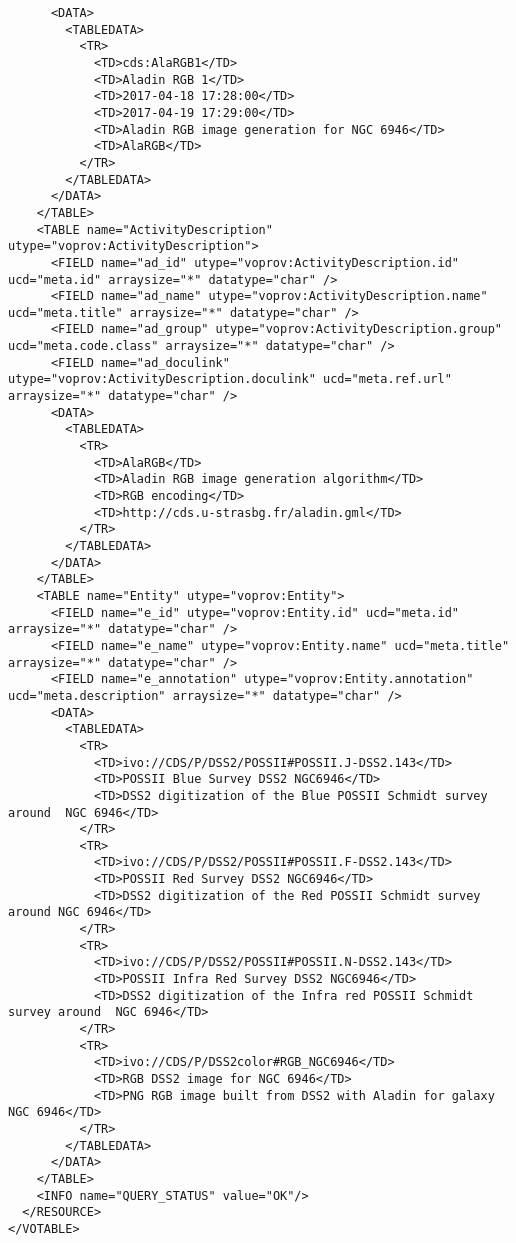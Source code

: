 \begin{verbatim}
      <DATA>
        <TABLEDATA>
          <TR>
            <TD>cds:AlaRGB1</TD>
            <TD>Aladin RGB 1</TD>
            <TD>2017-04-18 17:28:00</TD>
            <TD>2017-04-19 17:29:00</TD>
            <TD>Aladin RGB image generation for NGC 6946</TD>
            <TD>AlaRGB</TD>
          </TR>
        </TABLEDATA>
      </DATA>
    </TABLE>
    <TABLE name="ActivityDescription" utype="voprov:ActivityDescription">
      <FIELD name="ad_id" utype="voprov:ActivityDescription.id" ucd="meta.id" arraysize="*" datatype="char" />
      <FIELD name="ad_name" utype="voprov:ActivityDescription.name" ucd="meta.title" arraysize="*" datatype="char" />
      <FIELD name="ad_group" utype="voprov:ActivityDescription.group" ucd="meta.code.class" arraysize="*" datatype="char" />
      <FIELD name="ad_doculink" utype="voprov:ActivityDescription.doculink" ucd="meta.ref.url" arraysize="*" datatype="char" />
      <DATA>
        <TABLEDATA>
          <TR>
            <TD>AlaRGB</TD>
            <TD>Aladin RGB image generation algorithm</TD>
            <TD>RGB encoding</TD>
            <TD>http://cds.u-strasbg.fr/aladin.gml</TD>
          </TR>
        </TABLEDATA>
      </DATA>
    </TABLE>
    <TABLE name="Entity" utype="voprov:Entity">
      <FIELD name="e_id" utype="voprov:Entity.id" ucd="meta.id"  arraysize="*" datatype="char" />
      <FIELD name="e_name" utype="voprov:Entity.name" ucd="meta.title" arraysize="*" datatype="char" />
      <FIELD name="e_annotation" utype="voprov:Entity.annotation" ucd="meta.description" arraysize="*" datatype="char" />
      <DATA>
        <TABLEDATA>
          <TR>
            <TD>ivo://CDS/P/DSS2/POSSII#POSSII.J-DSS2.143</TD>
            <TD>POSSII Blue Survey DSS2 NGC6946</TD>
            <TD>DSS2 digitization of the Blue POSSII Schmidt survey around  NGC 6946</TD>
          </TR>
          <TR>
            <TD>ivo://CDS/P/DSS2/POSSII#POSSII.F-DSS2.143</TD>
            <TD>POSSII Red Survey DSS2 NGC6946</TD>
            <TD>DSS2 digitization of the Red POSSII Schmidt survey around NGC 6946</TD>
          </TR>
          <TR>
            <TD>ivo://CDS/P/DSS2/POSSII#POSSII.N-DSS2.143</TD>
            <TD>POSSII Infra Red Survey DSS2 NGC6946</TD>
            <TD>DSS2 digitization of the Infra red POSSII Schmidt survey around  NGC 6946</TD>
          </TR>
          <TR>
            <TD>ivo://CDS/P/DSS2color#RGB_NGC6946</TD>
            <TD>RGB DSS2 image for NGC 6946</TD>
            <TD>PNG RGB image built from DSS2 with Aladin for galaxy NGC 6946</TD>
          </TR>
        </TABLEDATA>
      </DATA>
    </TABLE>
    <INFO name="QUERY_STATUS" value="OK"/>
  </RESOURCE>
</VOTABLE>
\end{verbatim}
